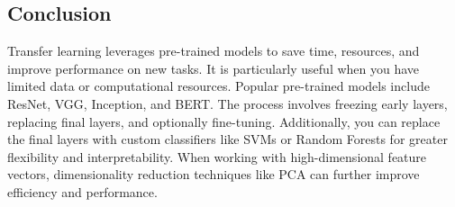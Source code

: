 \begin{notechapter}
\section{Conclusion}
Transfer learning leverages pre-trained models to save time, resources,
and improve performance on new tasks. It is particularly useful when you
have limited data or computational resources. Popular pre-trained models
include ResNet, VGG, Inception, and BERT. The process involves freezing
early layers, replacing final layers, and optionally fine-tuning. Additionally,
you can replace the final layers with custom classifiers like SVMs or Random
Forests for greater flexibility and interpretability. When working with
high-dimensional feature vectors, dimensionality reduction techniques like PCA
can further improve efficiency and performance.
\end{notechapter}

